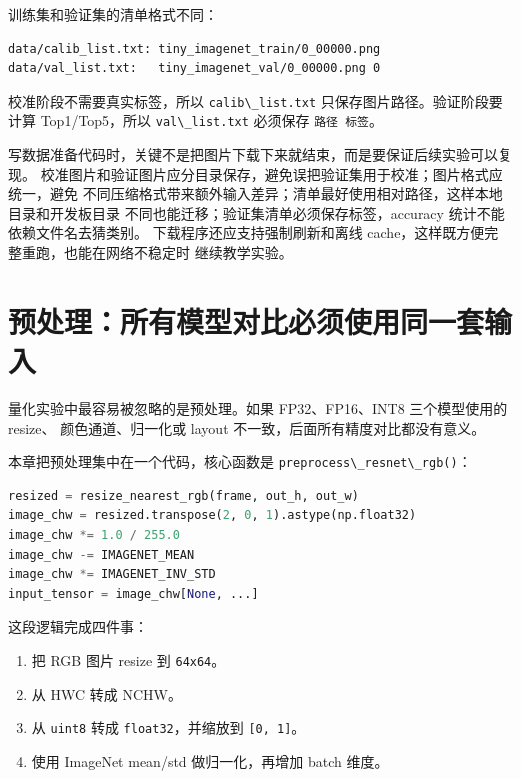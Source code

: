 训练集和验证集的清单格式不同：

\begin{lstlisting}
data/calib_list.txt: tiny_imagenet_train/0_00000.png
data/val_list.txt:   tiny_imagenet_val/0_00000.png 0
\end{lstlisting}

校准阶段不需要真实标签，所以 \passthrough{\lstinline!calib\_list.txt!}
只保存图片路径。验证阶段要计算 Top1/Top5，所以
\passthrough{\lstinline!val\_list.txt!} 必须保存
\passthrough{\lstinline!路径 标签!}。

写数据准备代码时，关键不是把图片下载下来就结束，而是要保证后续实验可以复现。
校准图片和验证图片应分目录保存，避免误把验证集用于校准；图片格式应统一，避免
不同压缩格式带来额外输入差异；清单最好使用相对路径，这样本地目录和开发板目录
不同也能迁移；验证集清单必须保存标签，accuracy
统计不能依赖文件名去猜类别。 下载程序还应支持强制刷新和离线
cache，这样既方便完整重跑，也能在网络不稳定时 继续教学实验。

\section{预处理：所有模型对比必须使用同一套输入}\label{src-book-chapter9-h5}

量化实验中最容易被忽略的是预处理。如果 FP32、FP16、INT8 三个模型使用的
resize、 颜色通道、归一化或 layout 不一致，后面所有精度对比都没有意义。

本章把预处理集中在一个代码，核心函数是
\passthrough{\lstinline!preprocess\_resnet\_rgb()!}：

\begin{lstlisting}[language=Python]
resized = resize_nearest_rgb(frame, out_h, out_w)
image_chw = resized.transpose(2, 0, 1).astype(np.float32)
image_chw *= 1.0 / 255.0
image_chw -= IMAGENET_MEAN
image_chw *= IMAGENET_INV_STD
input_tensor = image_chw[None, ...]
\end{lstlisting}

这段逻辑完成四件事：

\begin{enumerate}
\def\labelenumi{\arabic{enumi}.}
\tightlist
\item
  把 RGB 图片 resize 到 \passthrough{\lstinline!64x64!}。
\item
  从 HWC 转成 NCHW。
\item
  从 \passthrough{\lstinline!uint8!} 转成
  \passthrough{\lstinline!float32!}，并缩放到
  \passthrough{\lstinline![0, 1]!}。
\item
  使用 ImageNet mean/std 做归一化，再增加 batch 维度。
\end{enumerate}

